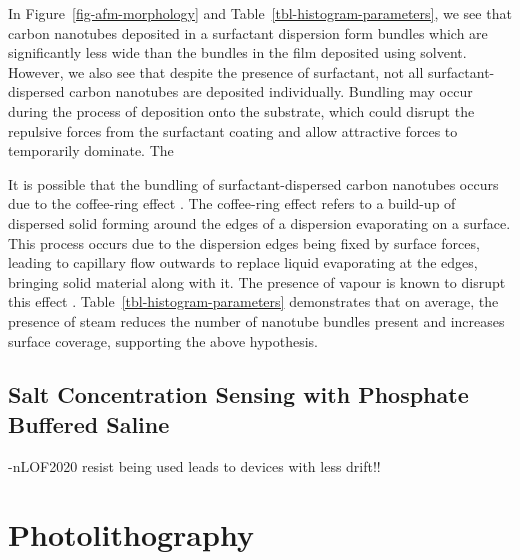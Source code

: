 \documentclass[
  a4paper,
]{scrbook}
\begin{document}
In Figure~\ref{fig-afm-morphology} and
Table~\ref{tbl-histogram-parameters}, we see that carbon nanotubes
deposited in a surfactant dispersion form bundles which are
significantly less wide than the bundles in the film deposited using
solvent. However, we also see that despite the presence of surfactant,
not all surfactant-dispersed carbon nanotubes are deposited
individually. Bundling may occur during the process of deposition onto
the substrate, which could disrupt the repulsive forces from the
surfactant coating and allow attractive forces to temporarily dominate.
The

It is possible that the bundling of surfactant-dispersed carbon
nanotubes occurs due to the coffee-ring effect
\autocite{Deegan1997,VanGaalen2021}. The coffee-ring effect refers to a
build-up of dispersed solid forming around the edges of a dispersion
evaporating on a surface. This process occurs due to the dispersion
edges being fixed by surface forces, leading to capillary flow outwards
to replace liquid evaporating at the edges, bringing solid material
along with it. The presence of vapour is known to disrupt this effect
\autocite{Bishop2020}. Table~\ref{tbl-histogram-parameters} demonstrates
that on average, the presence of steam reduces the number of nanotube
bundles present and increases surface coverage, supporting the above
hypothesis.

\hypertarget{sec-dummy-sensing}{%
\section{Salt Concentration Sensing with Phosphate Buffered
Saline}\label{sec-dummy-sensing}}

-nLOF2020 resist being used leads to devices with less drift!!

\appendix
{}

\hypertarget{sec-photolithography}{%
\chapter{Photolithography}\label{sec-photolithography}}
\end{document}
